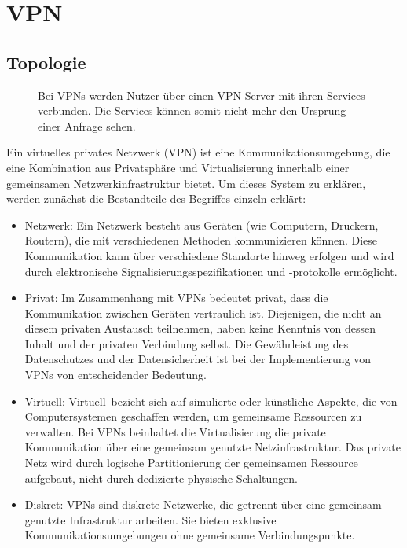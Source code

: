 \section{VPN}
\label{chap:vpn}

\subsection{Topologie}
\label{chap:vpn_topology}

\begin{figure}[h!]
    \centering
    
    \caption{Bei VPNs werden Nutzer über einen VPN-Server mit ihren Services verbunden. Die Services können somit nicht mehr den Ursprung einer Anfrage sehen.}
    \label{imgs:vpn}
\end{figure}

Ein virtuelles privates Netzwerk (VPN) ist eine Kommunikationsumgebung, die eine Kombination aus Privatsphäre und Virtualisierung innerhalb einer gemeinsamen Netzwerkinfrastruktur bietet. Um dieses System zu erklären, werden zunächst die Bestandteile des Begriffes einzeln erklärt:

\begin{itemize}
    \item Netzwerk: Ein Netzwerk besteht aus Geräten (wie Computern, Druckern, Routern), die mit verschiedenen Methoden kommunizieren können. Diese Kommunikation kann über verschiedene Standorte hinweg erfolgen und wird durch elektronische Signalisierungsspezifikationen und -protokolle ermöglicht.
    \item Privat: Im Zusammenhang mit VPNs bedeutet \glqq privat\grqq, dass die Kommunikation zwischen Geräten vertraulich ist. Diejenigen, die nicht an diesem privaten Austausch teilnehmen, haben keine Kenntnis von dessen Inhalt und der privaten Verbindung selbst. Die Gewährleistung des Datenschutzes und der Datensicherheit ist bei der Implementierung von VPNs von entscheidender Bedeutung.
    \item Virtuell: \glqq Virtuell\grqq\ bezieht sich auf simulierte oder künstliche Aspekte, die von Computersystemen geschaffen werden, um gemeinsame Ressourcen zu verwalten. Bei VPNs beinhaltet die Virtualisierung die private Kommunikation über eine gemeinsam genutzte Netzinfrastruktur. Das private Netz wird durch logische Partitionierung der gemeinsamen Ressource aufgebaut, nicht durch dedizierte physische Schaltungen.
    \item Diskret: VPNs sind diskrete Netzwerke, die getrennt über eine gemeinsam genutzte Infrastruktur arbeiten. Sie bieten exklusive Kommunikationsumgebungen ohne gemeinsame Verbindungspunkte.
\end{itemize}

